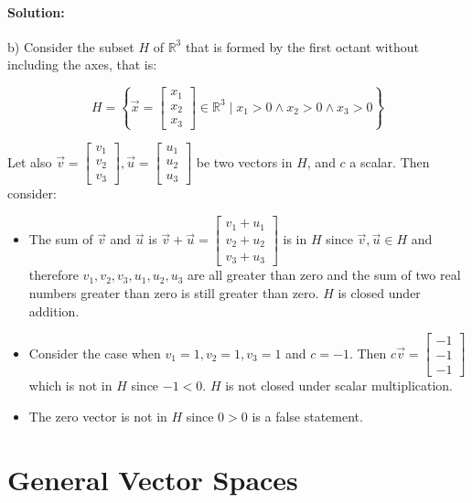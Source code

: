 \documentclass[12pt, letterpaper]{article}
\newcommand{\R}{\mathbb{R}}
\theoremstyle{statement}
\theoremstyle{statement}
\newenvironment{Solution}{\noindent\ignorespaces\paragraph{Solution:}}{\hfill \ding{122}\par\noindent}
\begin{document}
\begin{Solution}
\begin{itemize}
    \end{itemize}
    
    b) Consider the subset $H$ of $\R^3$ that is formed by the first octant without including the axes, that is:
    
    $$
    H = \left\{ \Vec{x} = \begin{bmatrix} x_1\\x_2\\x_3\end{bmatrix} \in \R^3
    \mid
    x_1 > 0 \land x_2 > 0 \land x_3 > 0
    \right\}
    $$
    
    Let also $\Vec{v} = \begin{bmatrix} v_1\\v_2\\v_3\end{bmatrix}, \Vec{u} = \begin{bmatrix} u_1\\u_2\\u_3\end{bmatrix}$ be two vectors in $H$, and $c$ a scalar. Then consider: 
    
    \begin{itemize}
        \item The sum of $\Vec{v}$ and $\Vec{u}$ is $\Vec{v}+\Vec{u}=\begin{bmatrix} v_1+u_1\\v_2+u_2\\v_3+u_3\end{bmatrix}$ is in $H$ since $\Vec{v}, \Vec{u} \in H$ and therefore $v_1, v_2, v_3, u_1, u_2, u_3$ are all greater than zero and the sum of two real numbers greater than zero is still greater than zero. $H$ is closed under addition.
        \item Consider the case when $v_1=1, v_2=1, v_3=1$ and $c=-1$. Then $c\Vec{v} = \begin{bmatrix} -1\\-1\\-1 \end{bmatrix}$ which is not in $H$ since $-1 < 0$. $H$ is not closed under scalar multiplication.
        \item The zero vector is not in $H$ since $0 > 0$ is a false statement. 
    \end{itemize}
    \end{Solution}
    
    \section*{General Vector Spaces}
\end{document}
